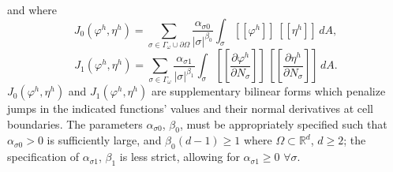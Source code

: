 	and where
	\begin{equation}
		J_0 (\varphi^h,\eta^h) = \sum_{\sigma \in \Gamma_\omega \cup \partial \Omega} \frac{\alpha_{\sigma0}}{|\sigma|^{\beta_0}} \int_{\sigma} [\![ \varphi^h ]\!] \, [\![ \eta^h ]\!] \, dA,
	\end{equation}
	\begin{equation}
		J_1 (\varphi^h,\eta^h) = \sum_{\sigma \in \Gamma_\omega} \frac{\alpha_{\sigma1}}{|\sigma|^{\beta_1}} \int_{\sigma} \left[\!\!\left[ \frac{\partial \varphi^h}{\partial N_{\sigma}} \right]\!\!\right] \, \left[\!\!\left[ \frac{\partial \eta^h}{\partial N_{\sigma}} \right]\!\!\right] \, dA.
	\end{equation}
	$J_0 (\varphi^h,\eta^h)$ and $J_1 (\varphi^h,\eta^h)$ are supplementary bilinear forms which penalize jumps in the indicated functions' values and their normal derivatives at cell boundaries. The parameters $\alpha_{\sigma0}$, $\beta_0$, must be appropriately specified such that $\alpha_{\sigma0} > 0$ is sufficiently large, and $\beta_0 (d-1) \geq 1$ where $\Omega \subset \mathbb{R}^d$, $d \geq 2$; the specification of $\alpha_{\sigma1}$, $\beta_1$ is less strict, allowing for $\alpha_{\sigma1} \geq 0 \, \, \forall \sigma$.
	
